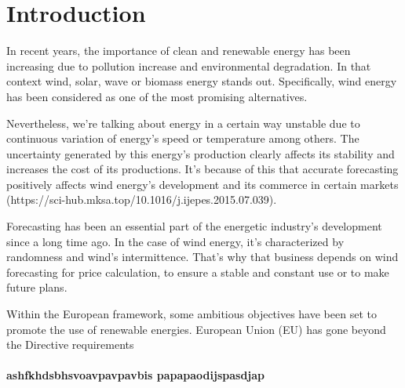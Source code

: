 \section{Introduction}

In recent years, the importance of clean and renewable energy has been increasing due to pollution increase and environmental degradation. In that context wind, solar, wave or biomass energy stands out. Specifically, wind energy has been considered as one of the most promising alternatives.

Nevertheless, we’re talking about energy in a certain way unstable due to continuous variation of energy’s speed or  temperature among others. The uncertainty generated by this energy’s production clearly affects its stability and increases the cost of its productions. It’s because of this that accurate forecasting  positively affects wind energy’s development and its commerce in certain markets (https://sci-hub.mksa.top/10.1016/j.ijepes.2015.07.039).

Forecasting has been an essential part of the energetic industry’s development since a long time ago. In the case of wind energy, it’s characterized by randomness and wind’s intermittence. That’s why that business depends on wind forecasting for price calculation, to ensure a stable and constant use or to make future plans.

Within the European framework, some ambitious objectives have been set to promote the use of renewable energies. European Union (EU) has gone beyond the Directive requirements
\paragraph{
ashfkhdsbhsvoavpavpavbis
papapaodijspasdjap
}

